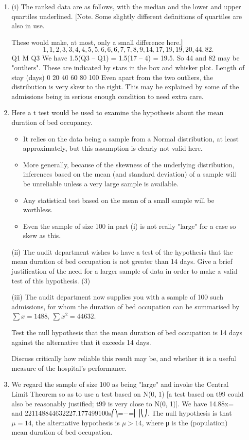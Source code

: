 \documentclass[a4paper,12pt]{article}
\begin{document}
\begin{enumerate}
\item 
(i) The ranked data are as follows, with the median and the lower and upper quartiles underlined. [Note. Some slightly different definitions of quartiles are also in use. 

These would make, at most, only a small difference here.]
\[1, 1, 2, 3, 3, 4, 4, 5, 5, 6, 6, 6, 7, 7, 8, 9, 14, 17, 19, 19, 20, 44, 82.\]
Q1 M Q3
We have 1.5(Q3 – Q1) = 1.5(17 – 4) = 19.5. So 44 and 82 may be "outliers". These are indicated by stars in the box and whisker plot.
Length of
stay (days)
0
20
40
60
80
100
Even apart from the two outliers, the distribution is very skew to the right. This may be explained by some of the admissions being in serious enough condition to need extra care.
\item  Here a t test would be used to examine the hypothesis about the mean duration of bed occupancy. 
\begin{itemize}
    \item It relies on the data being a sample from a Normal distribution, at least approximately, but this assumption is clearly not valid here.
    \item More generally, because of the skewness of the underlying distribution, inferences based on the mean (and standard deviation) of a sample will be unreliable unless a very large sample is available. 
    \item Any statistical test based on the mean of a small sample will be worthless. 
    \item Even the sample of size 100 in part (i) is not really "large" for a case so skew as this.
\end{itemize}
\newpage 
\begin{framed}
(ii) The audit department wishes to have a test of the hypothesis that the mean duration of bed occupation is not greater than 14 days.  Give a brief justification of the need for a larger sample of data in order to make a valid test of this hypothesis. (3) 
 
(iii) The audit department now supplies you with a sample of 100 such admissions, for whom the duration of bed occupation can be summarised by 
$ \sum x = 1488$,   $\sum x^2 = 44632$. 
 
Test the null hypothesis that the mean duration of bed occupation is 14 days against the alternative that it exceeds 14 days. 
 
Discuss critically how reliable this result may be, and whether it is a useful measure of the hospital's performance. 
 \end{framed}
 \item  We regard the sample of size 100 as being "large" and invoke the Central Limit Theorem so as to use a test based on N(0, 1) [a test based on t99 could also be reasonably justified; t99 is very close to N(0, 1)].
We have 14.88x= and 221148844632227.177499100s⎛⎞=−=⎜⎟⎝⎠.
The null hypothesis is that $\mu = 14$, the alternative hypothesis is $\mu > 14$, where μ is the (population) mean duration of bed occupation.


\end{enumerate}
\end{document}
